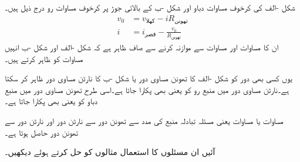 شکل -الف کی کرخوف مساوات دباو اور شکل -ب کے بالائی جوڑ پر کرخوف مساوات رو درج ذیل ہیں۔
\begin{align*}
v_0&=v_{\text{کھلا}}-i R_{\text{تھونن}}\\
i&=i_{\text{قصر}}-\frac{v_0}{R_{\text{تھونن}}}
\end{align*}
ان کا مساوات  اور مساوات  سے موازنہ کرنے سے صاف ظاہر ہے کہ شکل -الف اور شکل -ب انہیں مساوات کو ظاہر کرتے ہیں۔

یوں کسی بھی دور کو شکل -الف کا تھونن مساوی دور یا شکل -ب کا نارٹن مساوی دور ظاہر کر سکتا ہے۔نارٹن مساوی دور میں منبع رو کو  یعنی  بھی پکارا جاتا ہے۔اسی طرح تھونن مساوی دور میں منبع دباو کو  یعنی  بھی پکارا جاتا ہے۔

مساوات  یا مساوات  یعنی مسئلہ تبادلہ منبع کی مدد سے تھونن دور سے نارٹن دور اور نارٹن دور سے تھونن دور حاصل ہوتا ہے۔

آئیں ان مسئلوں کا استعمال مثالوں کو حل کرتے ہوئے دیکھیں۔


